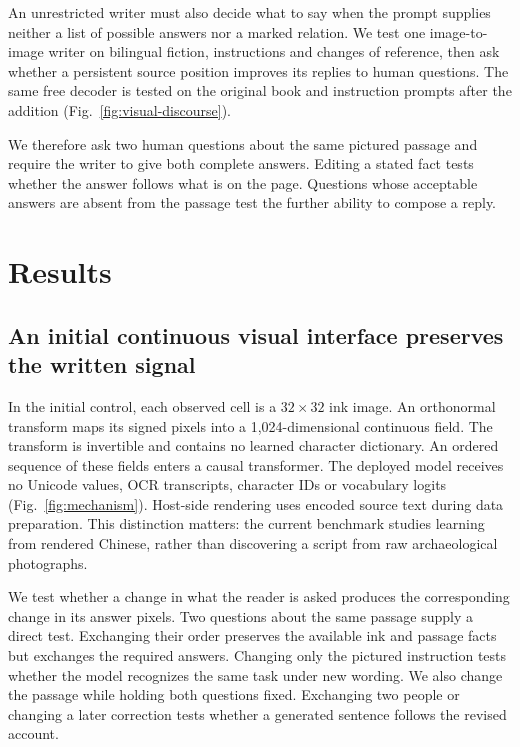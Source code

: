 \documentclass[12pt,a4paper]{article}
\providecommand{\DIFadd}[1]{{\protect\color{blue} \sf #1}} %
\providecommand{\DIFaddbegin}{} %
\providecommand{\DIFaddend}{} %
\begin{document}
\DIFadd{An unrestricted writer must also decide what to say when the prompt supplies neither a list of possible answers nor a marked relation. We test one image-to-image writer on bilingual fiction, instructions and changes of reference, then ask whether a persistent source position improves its replies to human questions. The same free decoder is tested on the original book and instruction prompts after the addition (Fig.~\ref{fig:visual-discourse}).
}

\DIFadd{We therefore ask two human questions about the same pictured passage and require the writer to give both complete answers. Editing a stated fact tests whether the answer follows what is on the page. Questions whose acceptable answers are absent from the passage test the further ability to compose a reply.
}


\DIFaddend \section*{Results}
\subsection*{An initial continuous visual interface preserves the written signal}
In the initial control, each observed cell is a $32\times32$ ink image. An orthonormal transform maps
its signed pixels into a 1,024-dimensional continuous field. The transform is
invertible and contains no learned character dictionary. An ordered sequence
of these fields enters a causal transformer. The deployed model receives no
Unicode values, OCR transcripts, character IDs or vocabulary logits
(Fig.~\ref{fig:mechanism}). Host-side rendering uses encoded source text during
data preparation. This distinction matters: the current benchmark studies
learning from rendered Chinese, rather than discovering a script from raw
archaeological photographs.

\DIFaddbegin \DIFadd{We test whether a change in what the reader is asked produces the corresponding change in its answer pixels. Two questions about the same passage supply a direct test. Exchanging their order preserves the available ink and passage facts but exchanges the required answers. Changing only the pictured instruction tests whether the model recognizes the same task under new wording. We also change the passage while holding both questions fixed. Exchanging two people or changing a later correction tests whether a generated sentence follows the revised account.
}
\end{document}
